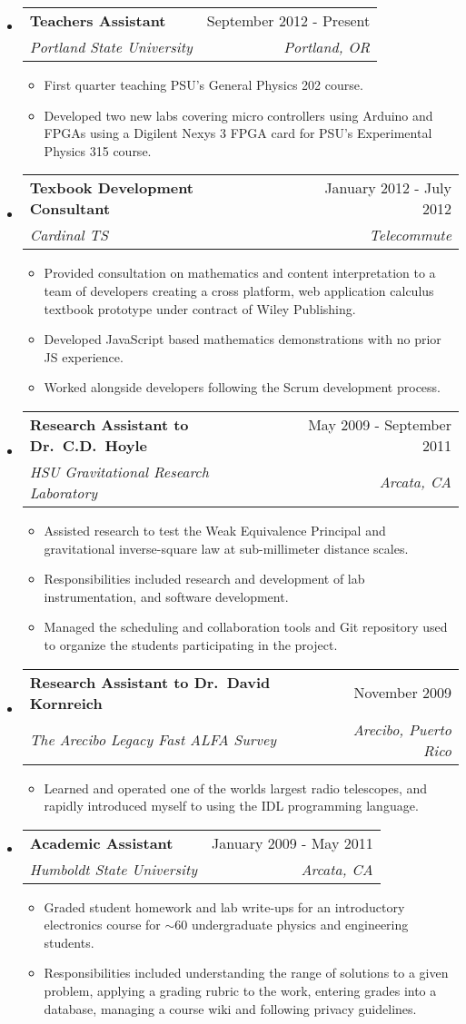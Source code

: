 \documentclass[letterpaper,11pt]{article}
\makeatletter
\newcommand{\resitem}[1]{\item #1 \vspace{-2pt}}
\newcommand{\ressubheading}[4]{
\begin{tabular*}{7.0in}{l@{\extracolsep{\fill}}r}
		\textbf{#1} & #2 \\
		\textit{#3} & \textit{#4} \\
\end{tabular*}\vspace{-6pt}}
\makeatother
\begin{document}
\begin{itemize}
	\item
		\ressubheading
        {Teachers Assistant}
        {September 2012 - Present}
        {Portland State University}
        {Portland, OR}
		\begin{itemize}
			\resitem{First quarter teaching PSU's General Physics 202 course.}
			\resitem{Developed two new labs covering micro controllers using Arduino and FPGAs using a Digilent Nexys 3 FPGA card for PSU's Experimental Physics 315 course.}
		\end{itemize}

	\item
		\ressubheading{Texbook Development Consultant}{January 2012 - July 2012}{Cardinal TS}{Telecommute}
		\begin{itemize}
			\resitem{Provided consultation on mathematics and content interpretation to a team of developers creating a cross platform, web application calculus textbook prototype under contract of Wiley Publishing.}
			\resitem{Developed JavaScript based mathematics demonstrations with no prior JS experience.}
            \resitem{Worked alongside developers following the Scrum development process.}
		\end{itemize}

\item
\ressubheading
{Research Assistant to Dr.\ C\@.D.\ Hoyle}
{May 2009 - September 2011}
{HSU Gravitational Research Laboratory}
{Arcata, CA}
\begin{itemize}
			\resitem{Assisted research to test the Weak Equivalence Principal and gravitational inverse-square law at sub-millimeter distance scales.}
			\resitem{Responsibilities included research and development of lab instrumentation, and software development.}
			\resitem{Managed the scheduling and collaboration tools and Git repository used to organize the students participating in the project.}
		\end{itemize}

	\item
		\ressubheading
        {Research Assistant to Dr.\ David Kornreich}{November 2009}{The Arecibo Legacy Fast ALFA Survey}{Arecibo, Puerto Rico}
		\begin{itemize}
            \resitem{Learned and operated one of the worlds largest radio telescopes, and rapidly introduced myself to using the IDL programming language.}
	\end{itemize}

	\item
		\ressubheading{Academic Assistant}{January 2009 - May 2011}{Humboldt State University}{Arcata, CA}
		\begin{itemize}
			\resitem{Graded student homework and lab write-ups for an introductory electronics course for $\sim$60 undergraduate physics and engineering students.}
			\resitem{Responsibilities included understanding the range of solutions to a given problem, applying a grading rubric to the work, entering grades into a database, managing a course wiki and following privacy guidelines.}
		\end{itemize}

\end{itemize}
\end{document}
